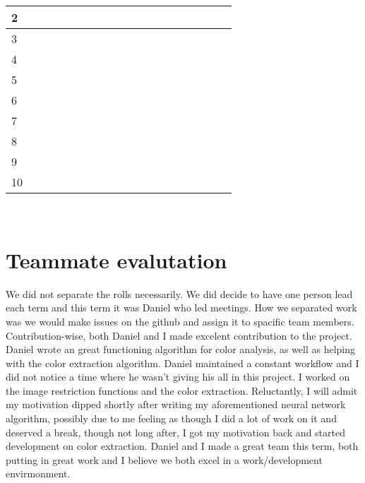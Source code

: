 \documentclass[onecolumn, draftclsnofoot,10pt, compsoc]{IEEEtran}
\begin{document}
\begin{singlespace}
\begin{tabular}{|l|p{0.3\linewidth}|p{0.3\linewidth}|p{0.3\linewidth}|}
		2 	& 
			& 
			&  \\\hline

		3 	& 
			& 
			&  \\\hline

		4 	& 
			& 
			&  \\\hline

		5 	& 
			&
			&  \\\hline

		6 	& 
			&
			&  \\\hline

		7 	& 
			& 
			&  \\\hline

		8 	& 
			&
			&  \\\hline

		9 	&
			&
			&  \\\hline

		10 	&
			&
			&  \\\hline
		\end{tabular}\\


	\section{Teammate evalutation}
	We did not separate the rolls necessarily. We did decide to have one person lead each term and this term it was Daniel who led meetings.  
	How we separated work was we would make issues on the github and assign it to spacific team members.
	Contribution-wise, both Daniel and I made excelent contribution to the project.
	Daniel wrote an great functioning algorithm for color analysis, as well as helping with the color extraction algorithm. 
	Daniel maintained a constant workflow and I did not notice a time where he wasn't giving his all in this project. 
	I worked on the image restriction functions and the color extraction.
	Reluctantly, I will admit my motivation dipped shortly after writing my aforementioned neural network algorithm, possibly due to me feeling as though I did a lot of work on it and deserved a break, though not long after, I got my motivation back and started development on color extraction.
	Daniel and I made a great team this term, both putting in great work and I believe we both excel in a work/development envirmonment.

\end{singlespace}
\end{document}
